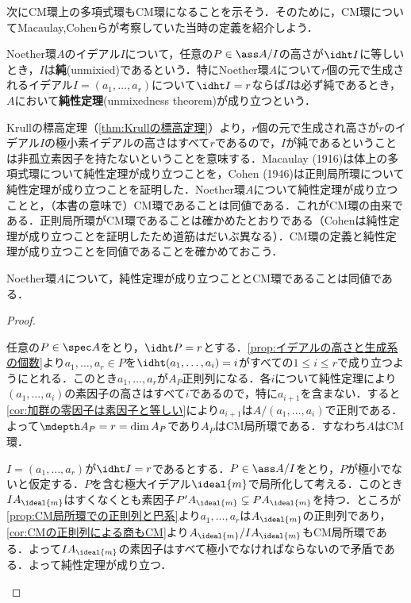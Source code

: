 次にCM環上の多項式環もCM環になることを示そう．そのために，CM環についてMacaulay,Cohenらが考察していた当時の定義を紹介しよう．

\begin{defi}[純性定理]
	Noether環$A$のイデアル$I$について，任意の$P\in\ass A/I$の高さが$\idht I$に等しいとき，$I$は\textbf{純}(unmixied)であるという．特にNoether環$A$について$r$個の元で生成されるイデアル$I=(a_1,\dots,a_r)$について$\idht I=r$ならば$I$は必ず純であるとき，$A$において\textbf{純性定理}(unmixedness theorem)が成り立つという．
\end{defi}

Krullの標高定理（\ref{thm:Krullの標高定理}）より，$r$個の元で生成され高さが$r$のイデアル$I$の極小素イデアルの高さはすべて$r$であるので，$I$が純であるということは非孤立素因子を持たないということを意味する．Macaulay (1916)は体上の多項式環について純性定理が成り立つことを，Cohen (1946)は正則局所環について純性定理が成り立つことを証明した．Noether環$A$について純性定理が成り立つことと，（本書の意味で）CM環であることは同値である．これがCM環の由来である．正則局所環がCM環であることは確かめたとおりである（Cohenは純性定理が成り立つことを証明したため道筋はだいぶ異なる）．CM環の定義と純性定理が成り立つことを同値であることを確かめておこう．

\begin{thm}
	Noether環$A$について，純性定理が成り立つこととCM環であることは同値である．
\end{thm}

\begin{proof}
	\begin{eqv}
		\item 任意の$P\in\spec A$をとり，$\idht P=r$とする．\ref{prop:イデアルの高さと生成系の個数}より$a_1,\dots,a_r\in P$を$\idht(a_1,\dots,a_i)=i$がすべての$1\leq i\leq r$で成り立つようにとれる．このとき$a_1,\dots,a_r$が$A_P$正則列になる．各$i$について純性定理により$(a_1,\dots,a_i)$の素因子の高さはすべて$i$であるので，特に$a_{i+1}$を含まない．すると\ref{cor:加群の零因子は素因子と等しい}により$a_{i+1}$は$A/(a_1,\dots,a_i)$で正則である．よって$\mdepth A_P=r=\dim A_P$であり$A_P$はCM局所環である．すなわち$A$はCM環．
		\item $I=(a_1,\dots,a_r)$が$\idht I=r$であるとする．$P\in\ass A/I$をとり，$P$が極小でないと仮定する．$P$を含む極大イデアル$\ideal{m}$で局所化して考える．このとき$IA_{\ideal{m}}$はすくなくとも素因子$P'A_{\ideal{m}}\subsetneq PA_{\ideal{m}}$を持つ．ところが\ref{prop:CM局所環での正則列と巴系}より$a_1,\dots,a_r$は$A_{\ideal{m}}$の正則列であり，\ref{cor:CMの正則列による商もCM}より$A_{\ideal{m}}/IA_{\ideal{m}}$もCM局所環である．よって$IA_{\ideal{m}}$の素因子はすべて極小でなければならないので矛盾である．よって純性定理が成り立つ．
	\end{eqv}
\end{proof}

